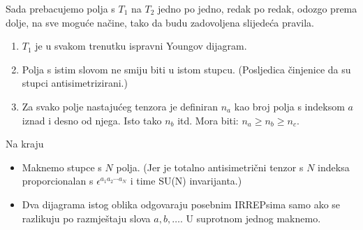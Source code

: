 Sada prebacujemo polja s $T_1$ na $T_2$ jedno po jedno, redak
po redak, odozgo prema dolje, na sve moguće načine, tako da
budu zadovoljena slijedeća pravila.
\begin{enumerate}
\item $T_1$ je u svakom trenutku ispravni Youngov dijagram.
\item Polja s istim slovom ne smiju biti u istom stupcu.
 (Posljedica činjenice da su stupci antisimetrizirani.)
\item Za svako polje nastajućeg tenzora je definiran $n_a$
kao broj polja s indeksom $a$ iznad i desno od njega.
Isto tako $n_b$ itd. Mora biti: $n_a \ge n_b \ge n_c$.
\end{enumerate}
Na kraju 
\begin{itemize}
\item Maknemo stupce s $N$ polja. (Jer je totalno
antisimetrični tenzor s $N$ indeksa proporcionalan
s $\epsilon^{a_1 a_2 \cdots a_N}$ i time SU(N)
invarijanta.)
\item Dva dijagrama istog oblika  odgovaraju
posebnim IRREPsima samo ako se razlikuju po razmještaju
slova $a,b,\dots$. U suprotnom jednog maknemo.
\end{itemize}


